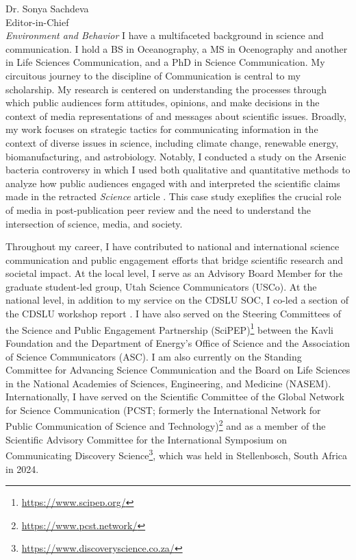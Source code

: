 \documentclass[12pt]{GUETletter}
\begin{document}
\begin{letter}{
               Dr. Sonya Sachdeva\\ 
               Editor-in-Chief\\
               \textit{Environment and Behavior}
               }
I have a multifaceted background in science and communication. I hold a BS in Oceanography, a MS in Ocenography and another in Life Sciences Communication, and a PhD in Science Communication. My circuitous journey to the discipline of Communication is central to my scholarship. My research is centered on understanding the processes through which public audiences form attitudes, opinions, and make decisions in the context of media representations of and messages about scientific issues. Broadly, my work focuses on strategic tactics for communicating information in the context of diverse issues in science, including climate change, renewable energy, biomanufacturing, and astrobiology. Notably, I conducted a study on the Arsenic bacteria controversy \parencite{yeoCaseArseniclifeBlogs2017} in which I used both qualitative and quantitative methods to analyze how public audiences engaged with and interpreted the scientific claims made in the retracted \textit{Science} article \parencite{wolfe-simonBacteriumThatCan2011}. This case study exeplifies the crucial role of media in post-publication peer review and the need to understand the intersection of science, media, and society.

\vspace{1em}

Throughout my career, I have contributed to national and international science communication and public engagement efforts that bridge scientific research and societal impact. At the local level, I serve as an Advisory Board Member for the graduate student-led group, Utah Science Communicators (USCo). At the national level, in addition to my service on the CDSLU SOC, I co-led a section of the CDSLU workshop report \parencite{bimmWorkshopReportCommunicatingforthcoming}. I have also served on the Steering Committees of the Science and Public Engagement Partnership (SciPEP)\footnote{\href{https://www.scipep.org/}{https://www.scipep.org/}} between the Kavli Foundation and the Department of Energy's Office of Science and the Association of Science Communicators (ASC). I am also currently on the Standing Committee for Advancing Science Communication and the Board on Life Sciences in the National Academies of Sciences, Engineering, and Medicine (NASEM). Internationally, I have served on the Scientific Committee of the Global Network for Science Communication (PCST; formerly the International Network for Public Communication of Science and Technology)\footnote{\href{https://www.pcst.network/}{https://www.pcst.network/}} and as a member of the Scientific Advisory Committee for the International Symposium on Communicating Discovery Science\footnote{\href{https://www.discoveryscience.co.za/}{https://www.discoveryscience.co.za/}}, which was held in Stellenbosch, South Africa in 2024.


\end{letter}
\end{document}
